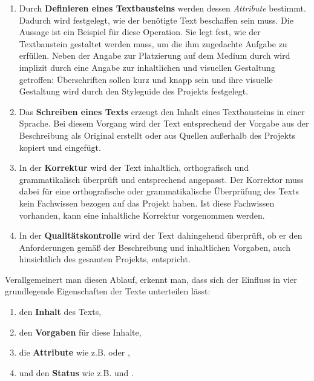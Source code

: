 \begin{enumerate}
\item Durch \textbf{Definieren eines Textbausteins} werden dessen \emph{Attribute} bestimmt. Dadurch wird festgelegt, wie der benötigte Text beschaffen sein muss. Die Aussage  ist ein Beispiel für diese Operation. Sie legt fest, wie der Textbaustein gestaltet werden muss, um die ihm zugedachte Aufgabe zu erfüllen. Neben der Angabe zur Platzierung auf dem Medium durch  wird implizit durch  eine Angabe zur inhaltlichen und visuellen Gestaltung getroffen: Überschriften sollen kurz und knapp sein und ihre visuelle Gestaltung wird durch den Styleguide des Projekts festgelegt.
\item Das \textbf{Schreiben eines Texts} erzeugt den Inhalt eines Textbausteins in einer Sprache. Bei diesem Vorgang wird der Text entsprechend der Vorgabe aus der Beschreibung als Original erstellt oder aus Quellen außerhalb des Projekts kopiert und eingefügt.
\item In der \textbf{Korrektur} wird der Text inhaltlich, orthografisch und grammatikalisch überprüft und entsprechend angepasst. Der Korrektor muss dabei für eine orthografische oder grammatikalische Überprüfung des Texts kein Fachwissen bezogen auf das Projekt haben. Ist diese Fachwissen vorhanden, kann eine inhaltliche Korrektur vorgenommen werden.
\item In der \textbf{Qualitätskontrolle} wird der Text dahingehend überprüft, ob er den Anforderungen gemäß der Beschreibung und inhaltlichen Vorgaben, auch hinsichtlich des gesamten Projekts, entspricht.
\end{enumerate}

\begin{samepage}
Verallgemeinert man diesen Ablauf, erkennt man, dass sich der Einfluss in vier grundlegende Eigenschaften der Texte unterteilen lässt:

\begin{enumerate}\itemsep -5pt
\item den \textbf{Inhalt} des Texts,
\item den \textbf{Vorgaben} für diese Inhalte,
\item die \textbf{Attribute} wie z.B.  oder ,
\item und den \textbf{Status} wie z.B.  und .
\end{enumerate}
\end{samepage}

